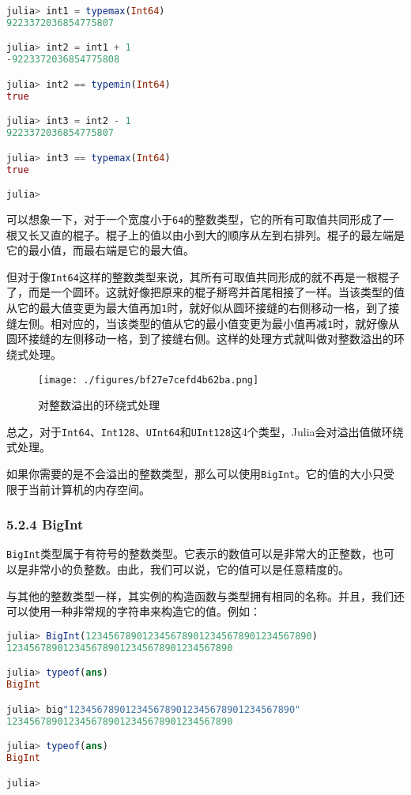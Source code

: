 \begin{lstlisting}[language=julia]
julia> int1 = typemax(Int64)
9223372036854775807

julia> int2 = int1 + 1
-9223372036854775808

julia> int2 == typemin(Int64)
true

julia> int3 = int2 - 1
9223372036854775807

julia> int3 == typemax(Int64)
true

julia> 
\end{lstlisting}

可以想象一下，对于一个宽度小于\verb|64|的整数类型，它的所有可取值共同形成了一根又长又直的棍子。棍子上的值以由小到大的顺序从左到右排列。棍子的最左端是它的最小值，而最右端是它的最大值。

但对于像\verb|Int64|这样的整数类型来说，其所有可取值共同形成的就不再是一根棍子了，而是一个圆环。这就好像把原来的棍子掰弯并首尾相接了一样。当该类型的值从它的最大值变更为最大值再加\verb|1|时，就好似从圆环接缝的右侧移动一格，到了接缝左侧。相对应的，当该类型的值从它的最小值变更为最小值再减\verb|1|时，就好像从圆环接缝的左侧移动一格，到了接缝右侧。这样的处理方式就叫做对整数溢出的环绕式处理。

\begin{figure}[ht]
\centering
\texttt{[image: ./figures/bf27e7cefd4b62ba.png]}
\caption{对整数溢出的环绕式处理} \label{fig_JuC5S2_1}
\end{figure}

总之，对于\verb|Int64|、\verb|Int128|、\verb|UInt64|和\verb|UInt128|这4个类型，Julia会对溢出值做环绕式处理。

如果你需要的是不会溢出的整数类型，那么可以使用\verb|BigInt|。它的值的大小只受限于当前计算机的内存空间。

\subsubsection{5.2.4 BigInt}

\verb|BigInt|类型属于有符号的整数类型。它表示的数值可以是非常大的正整数，也可以是非常小的负整数。由此，我们可以说，它的值可以是任意精度的。

与其他的整数类型一样，其实例的构造函数与类型拥有相同的名称。并且，我们还可以使用一种非常规的字符串来构造它的值。例如：

\begin{lstlisting}[language=julia]
julia> BigInt(1234567890123456789012345678901234567890)
1234567890123456789012345678901234567890

julia> typeof(ans)
BigInt

julia> big"1234567890123456789012345678901234567890"
1234567890123456789012345678901234567890

julia> typeof(ans)
BigInt

julia>
\end{lstlisting}


